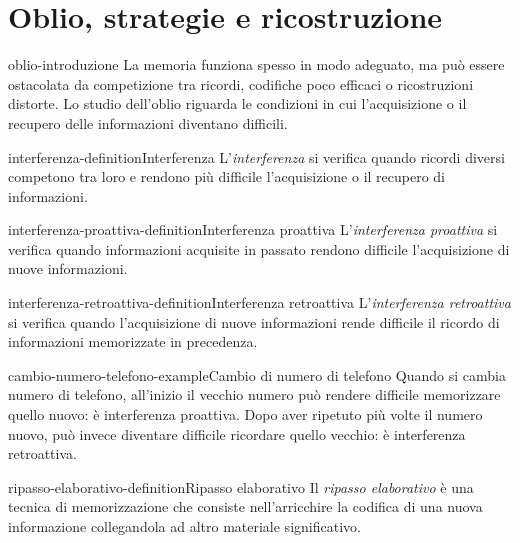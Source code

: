 \documentclass[preview]{standalone}
\begin{document}
\genpage

\section{Oblio, strategie e ricostruzione}

\begin{snippet}{oblio-introduzione}
    La memoria funziona spesso in modo adeguato, ma può essere ostacolata da
    competizione tra ricordi, codifiche poco efficaci o ricostruzioni distorte.
    Lo studio dell'oblio riguarda le condizioni in cui l'acquisizione o il
    recupero delle informazioni diventano difficili.
\end{snippet}

\begin{snippetdefinition}{interferenza-definition}{Interferenza}
    L'\emph{interferenza} si verifica quando ricordi diversi competono tra loro
    e rendono più difficile l'acquisizione o il recupero di informazioni.
\end{snippetdefinition}

\begin{snippetdefinition}{interferenza-proattiva-definition}{Interferenza proattiva}
    L'\emph{interferenza proattiva} si verifica quando informazioni acquisite in
    passato rendono difficile l'acquisizione di nuove informazioni.
\end{snippetdefinition}

\begin{snippetdefinition}{interferenza-retroattiva-definition}{Interferenza retroattiva}
    L'\emph{interferenza retroattiva} si verifica quando l'acquisizione di nuove
    informazioni rende difficile il ricordo di informazioni memorizzate in
    precedenza.
\end{snippetdefinition}

\begin{snippetexample}{cambio-numero-telefono-example}{Cambio di numero di telefono}
    Quando si cambia numero di telefono, all'inizio il vecchio numero può
    rendere difficile memorizzare quello nuovo: è interferenza proattiva. Dopo
    aver ripetuto più volte il numero nuovo, può invece diventare difficile
    ricordare quello vecchio: è interferenza retroattiva.
\end{snippetexample}

\begin{snippetdefinition}{ripasso-elaborativo-definition}{Ripasso elaborativo}
    Il \emph{ripasso elaborativo} è una tecnica di memorizzazione che consiste
    nell'arricchire la codifica di una nuova informazione collegandola ad altro
    materiale significativo.
\end{snippetdefinition}
\end{document}
